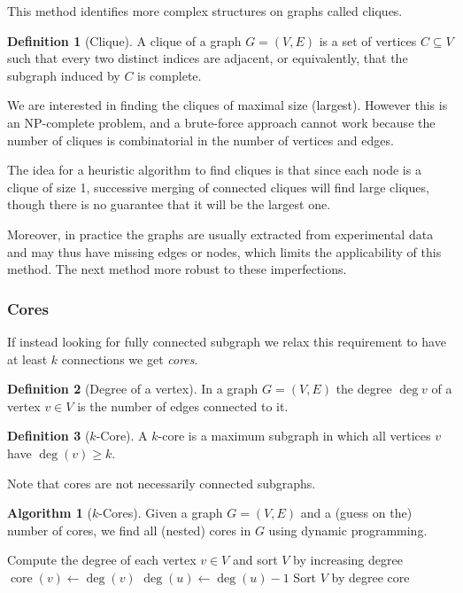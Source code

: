 \documentclass[a4paper]{article}
\theoremstyle{plain}
\theoremstyle{definition}
\newtheorem{defn}{Definition}[section]
\newtheorem{alg}{Algorithm}[section]
\theoremstyle{remark}
\begin{document}
This method identifies more complex structures on graphs called cliques.
\begin{defn}[Clique]
  A clique of a graph $G = (V, E)$ is a set of vertices $C \subseteq V$ such
  that every two distinct indices are adjacent, or equivalently, that the
  subgraph induced by $C$ is complete.
\end{defn}
We are interested in finding the cliques of maximal size (largest). However
this is an NP-complete problem, and a brute-force approach cannot work because
the number of cliques is combinatorial in the number of vertices and edges.

The idea for a heuristic algorithm to find cliques is that since each node is
a clique of size 1, successive merging of connected cliques will find large
cliques, though there is no guarantee that it will be the largest one.

Moreover, in practice the graphs are usually extracted from experimental data
and may thus have missing edges or nodes, which limits the applicability of
this method. The next method more robust to these imperfections.

\subsubsection{Cores}

If instead looking for fully connected subgraph we relax this requirement to
have at least $k$ connections we get \emph{cores}.

\begin{defn}[Degree of a vertex]
  In a graph $G = (V,E)$ the degree $\deg v$ of a vertex $v \in V$ is the
  number of edges connected to it.
\end{defn}

\begin{defn}[$k$-Core]
  A $k$-core is a maximum subgraph in which all vertices $v$ have $\deg(v)
  \geq k$.
\end{defn}
Note that cores are not necessarily connected subgraphs.

\begin{alg}[$k$-Cores]
  Given a graph $G = (V,E)$ and a (guess on the) number of cores, we find all
  (nested) cores in $G$ using dynamic programming.
  \begin{algorithmic}
      \State Compute the degree of each vertex $v \in V$ and sort $V$ by
        increasing degree
        \State $\operatorname{core}(v) \gets \deg(v)$
            \State $\deg(u) \gets \deg(u) - 1$
            \State Sort $V$ by degree
          \EndIf
        \EndFor
      \EndFor
      \State \Return core
    \EndFunction
  \end{algorithmic}
\end{alg}
\end{document}
